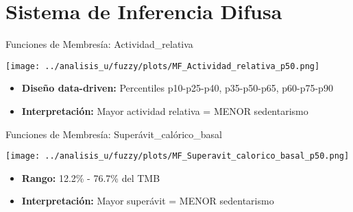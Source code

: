 \documentclass[aspectratio=169]{beamer}
\begin{document}

\section{Sistema de Inferencia Difusa}

\begin{frame}{Funciones de Membresía: Actividad\_relativa}

\begin{center}
\texttt{[image: ../analisis\_u/fuzzy/plots/MF\_Actividad\_relativa\_p50.png]}
\end{center}

\begin{itemize}
    \item \textbf{Diseño data-driven:} Percentiles p10-p25-p40, p35-p50-p65, p60-p75-p90
    \item \textbf{Interpretación:} Mayor actividad relativa = MENOR sedentarismo
\end{itemize}

\end{frame}


\begin{frame}{Funciones de Membresía: Superávit\_calórico\_basal}

\begin{center}
\texttt{[image: ../analisis\_u/fuzzy/plots/MF\_Superavit\_calorico\_basal\_p50.png]}
\end{center}

\begin{itemize}
    \item \textbf{Rango:} 12.2\% - 76.7\% del TMB
    \item \textbf{Interpretación:} Mayor superávit = MENOR sedentarismo
\end{itemize}

\end{frame}

\end{document}

